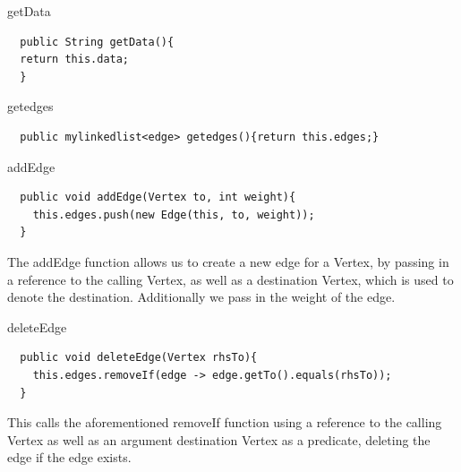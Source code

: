 \documentclass[a4paper]{article}
\begin{document}
\vspace{6mm}

\begin{algorithm}
\caption{getData}\label{euclid}
\begin{verbatim}
  public String getData(){
  return this.data;
  }
\end{verbatim}
\end{algorithm}
\newpage


\begin{algorithm}
\caption{getedges}\label{euclid}
\begin{verbatim}
  public mylinkedlist<edge> getedges(){return this.edges;}
\end{verbatim}
\end{algorithm}




\begin{algorithm}
\caption{addEdge}\label{euclid}
\begin{verbatim}
  public void addEdge(Vertex to, int weight){
    this.edges.push(new Edge(this, to, weight));
  }
\end{verbatim}
\end{algorithm}

\vspace{4mm}

The addEdge function allows us to create a new edge for a Vertex,
by passing in a reference to the calling Vertex, as well as a destination Vertex,
which is used to denote the destination. Additionally we pass in the weight of the edge.


\vspace{4mm}
\begin{algorithm}
\caption{deleteEdge}\label{euclid}
\begin{verbatim}
  public void deleteEdge(Vertex rhsTo){
    this.edges.removeIf(edge -> edge.getTo().equals(rhsTo));
  }
\end{verbatim}
\end{algorithm}


This calls the aforementioned removeIf function using a reference to 
the calling Vertex as well as an argument destination Vertex as a predicate, 
deleting the edge if the edge exists.

\newpage


\vspace*{0pt}
\end{document}
